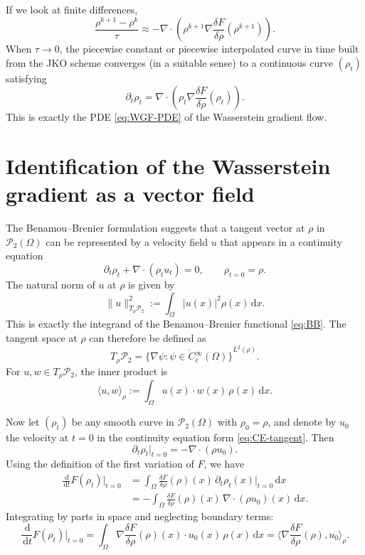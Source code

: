 \documentclass[11pt]{article}
\numberwithin{equation}{section}
\theoremstyle{definition}
\newcommand{\Ptwo}{\mathcal{P}_2}
\newcommand{\dd}{\,\mathrm{d}}
\begin{document}
If we look at finite differences,
\[
\frac{\rho^{k+1} - \rho^k}{\tau}
\approx - \nabla\cdot\left(\rho^{k+1}\nabla\frac{\delta F}{\delta \rho}(\rho^{k+1})\right).
\]
When $\tau\to 0$, the piecewise constant or piecewise interpolated curve in time built from the JKO scheme converges (in a suitable sense) to a continuous curve $(\rho_t)$ satisfying
\[
\partial_t \rho_t
= \nabla\cdot\left(\rho_t \nabla\frac{\delta F}{\delta \rho}(\rho_t)\right).
\]
This is exactly the PDE \eqref{eq:WGF-PDE} of the Wasserstein gradient flow.

\section{Identification of the Wasserstein gradient as a vector field}

The Benamou--Brenier formulation suggests that a tangent vector at $\rho$ in $\Ptwo(\Omega)$ can be represented by a velocity field $u$ that appears in a continuity equation
\begin{equation}
\label{eq:CE-tangent}
\partial_t \rho_t + \nabla\cdot(\rho_t u_t) = 0,
\qquad \rho_{t=0} = \rho.
\end{equation}
The natural norm of $u$ at $\rho$ is given by
\[
\|u\|_{T_\rho \Ptwo}^2
:= \int_{\Omega} |u(x)|^2 \rho(x)\dd x.
\]
This is exactly the integrand of the Benamou--Brenier functional \eqref{eq:BB}. The tangent space at $\rho$ can therefore be defined as
\[
T_{\rho}\Ptwo
= \overline{\{\nabla\psi : \psi\in C_c^\infty(\Omega)\}}^{L^2(\rho)}.
\]
For $u,w \in T_{\rho}\Ptwo$, the inner product is
\[
\langle u,w\rangle_{\rho}
:= \int_{\Omega} u(x)\cdot w(x)\,\rho(x)\dd x.
\]

Now let $(\rho_t)$ be any smooth curve in $\Ptwo(\Omega)$ with $\rho_0 = \rho$, and denote by $u_0$ the velocity at $t=0$ in the continuity equation form \eqref{eq:CE-tangent}. Then
\[
\partial_t \rho_t\big|_{t=0}
= -\nabla\cdot(\rho u_0).
\]
Using the definition of the first variation of $F$, we have
\begin{align*}
\frac{\dd}{\dd t}F(\rho_t)\bigg|_{t=0}
&= \int_{\Omega} \frac{\delta F}{\delta \rho}(\rho)(x)\,\partial_t\rho_t(x)\big|_{t=0}\dd x \\
&= -\int_{\Omega} \frac{\delta F}{\delta \rho}(\rho)(x)\,\nabla\cdot(\rho u_0)(x)\dd x.
\end{align*}
Integrating by parts in space and neglecting boundary terms:
\[
\frac{\dd}{\dd t}F(\rho_t)\bigg|_{t=0}
= \int_{\Omega} \nabla\frac{\delta F}{\delta \rho}(\rho)(x)\cdot u_0(x)\,\rho(x)\dd x
= \langle \nabla\frac{\delta F}{\delta \rho}(\rho), u_0\rangle_{\rho}.
\]
\end{document}

